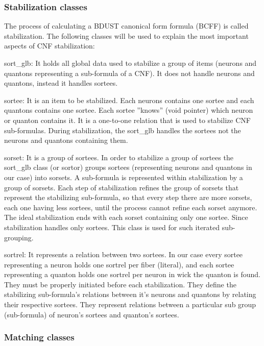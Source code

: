 \documentclass{easychair}
\newcommand{\neuron}{\textsf{neuron}}
\newcommand{\quanton}{\textsf{quanton}}
\newcommand{\sortglb}{\textsf{sort\_glb}}
\newcommand{\sortee}{\textsf{sortee}}
\newcommand{\sorset}{\textsf{sorset}}
\newcommand{\sortrel}{\textsf{sortrel}}
\begin{document}
\subsubsection{Stabilization classes}

The process of calculating a BDUST canonical form formula (BCFF) is called stabilization. The following classes will be used to explain the most important aspects of CNF stabilization:

{\sortglb}: It holds all global data used to stabilize a group of items ({\neuron}s and {\quanton}s representing a sub-formula of a CNF). It does not handle {\neuron}s and {\quanton}s, instead it handles {\sortee}s.

{\sortee}: It is an item to be stabilized. Each {\neuron}s contains one {\sortee} and each {\quanton}s contains one {\sortee}. Each {\sortee} ''knows'' (void pointer) which {\neuron} or {\quanton} contains it. It is a one-to-one relation that is used to stabilize CNF sub-formulas. During stabilization, the {\sortglb} handles the {\sortee}s not the {\neuron}s and {\quanton}s containing them.

{\sorset}: It is a group of {\sortee}s. In  order to stabilize a group of {\sortee}s the {\sortglb} class (or sortor) groups {\sortee}s (representing {\neuron}s and {\quanton}s in our case) into {\sorset}s. A sub-formula is represented within stabilization by a group of {\sorset}s. Each step of stabilization refines the group of {\sorset}s that represent the stabilizing sub-formula, so that every step there are more {\sorset}s, each one having less {\sortee}s, until the process cannot refine each {\sorset} anymore. The ideal stabilization ends with each {\sorset} containing only one {\sortee}. Since stabilization handles only {\sortee}s. This class is used for such iterated sub-grouping.

{\sortrel}: It represents a relation between two {\sortee}s. In our case every {\sortee} representing a {\neuron} holds one {\sortrel} per fiber (literal), and each {\sortee} representing a {\quanton} holds one {\sortrel} per {\neuron} in wick the {\quanton} is found. They must be properly initiated before each stabilization. They define the stabilizing sub-formula's relations between it's {\neuron}s and {\quanton}s by relating their respective {\sortee}s. They represent relations between a particular sub group (sub-formula) of {\neuron}'s {\sortee}s and {\quanton}'s {\sortee}s.

\subsubsection{Matching classes}
\end{document}
